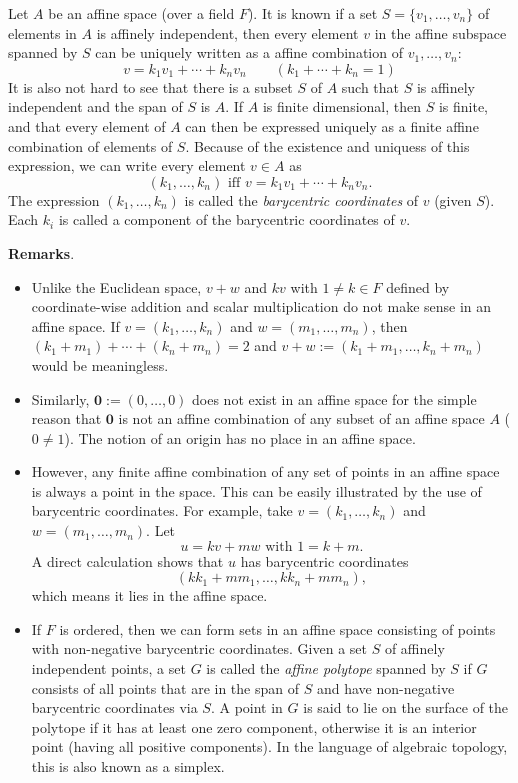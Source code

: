 \documentclass[12pt]{article}
\begin{document}
Let $A$ be an affine space (over a field $F$).  It is known if a set $S=\lbrace v_1,\ldots,v_n\rbrace$ of elements in $A$ is affinely independent, then every element $v$ in the affine subspace spanned by $S$ can be uniquely written as a affine combination of $v_1,\ldots,v_n$:
$$v=k_1v_1+\cdots+k_nv_n\qquad (k_1+\cdots+k_n=1)$$
It is also not hard to see that there is a subset $S$ of $A$ such that $S$ is affinely independent and the span of $S$ is $A$.  If $A$ is finite dimensional, then $S$ is finite, and that every element of $A$ can then be expressed uniquely as a finite affine combination of elements of $S$.  Because of the existence and uniquess of this expression, we can write every element $v\in A$ as $$(k_1,\ldots,k_n)\mbox{ iff }v=k_1v_1+\cdots+k_nv_n.$$  The expression $(k_1,\ldots,k_n)$ is called the \emph{barycentric coordinates} of $v$ (given $S$).  Each $k_i$ is called a component of the barycentric coordinates of $v$.

\textbf{Remarks}.
\begin{itemize}
\item Unlike the Euclidean space, $v+w$ and $kv$ with $1\neq k\in F$ defined by coordinate-wise addition and scalar multiplication do not make sense in an affine space.  If $v=(k_1,\ldots,k_n)$ and $w=(m_1,\ldots,m_n)$, then $(k_1+m_1)+\cdots+(k_n+m_n)=2$ and $v+w:=(k_1+m_1,\ldots,k_n+m_n)$ would be meaningless.
\item Similarly, $\boldsymbol{0}:=(0,\ldots,0)$ does not exist in an affine space for the simple reason that $\boldsymbol{0}$ is not an affine combination of any subset of an affine space $A$ ($0\neq 1$).  The notion of an origin has no place in an affine space.
\item However, any finite affine combination of any set of points in an affine space is always a point in the space.  This can be easily illustrated by the use of barycentric coordinates.  For example, take $v=(k_1,\ldots,k_n)$ and $w=(m_1,\ldots,m_n)$.  Let $$u=kv+mw\mbox{ with }1=k+m.$$  A direct calculation shows that $u$ has barycentric coordinates $$(kk_1+mm_1,\ldots,kk_n+mm_n),$$ which means it lies in the affine space. 
\item If $F$ is ordered, then we can form sets in an affine space consisting of points with non-negative barycentric coordinates.  Given a set $S$ of affinely independent points, a set $G$ is called the \emph{affine polytope} spanned by $S$ if $G$ consists of all points that are in the span of $S$ and have non-negative barycentric coordinates via $S$.  A point in $G$ is said to lie on the surface of the polytope if it has at least one zero component, otherwise it is an interior point (having all positive components).  In the language of algebraic topology, this is also known as a simplex.
\end{itemize}
\end{document}
